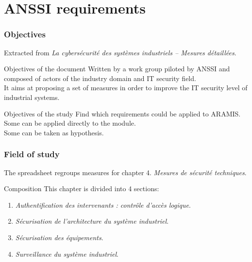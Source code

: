 \section{ANSSI requirements}

\begin{frame}
    \frametitle{Objectives}

    Extracted from {\em La cybers\'ecurit\'e des syst\`emes industriels -- Mesures d\'etaill\'ees}.
    \vfill
    \begin{block}{Objectives of the document}
        Written by a work group piloted by ANSSI and composed of actors of the industry domain and IT security field.\\
        \medskip
        It aims at proposing a set of measures in order to improve the IT security level of industrial systems.
    \end{block}
    \vfill
    \begin{block}{Objectives of the study}
        Find which requirements could be applied to ARAMIS.\\
        \medskip
        Some can be applied directly to the module.\\
        Some can be taken as hypothesis.
    \end{block}
\end{frame}

\begin{frame}
    \frametitle{Field of study}

    The spreadsheet regroups measures for chapter 4. {\em Mesures de s\'ecurit\'e techniques}.
    \vfill
    \begin{block}{Composition}
        This chapter is divided into 4 sections:
        \begin{enumerate}
            \item {\em Authentification des intervenants : contr\^ole d'acc\`es logique}.
            \item {\em S\'ecurisation de l'architecture du syst\`eme industriel}.
            \item {\em S\'ecurisation des \'equipements}.
            \item {\em Surveillance du syst\`eme industriel}.
        \end{enumerate}
    \end{block}
\end{frame}


